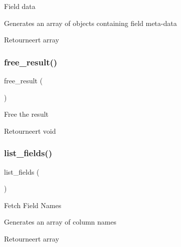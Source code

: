 Field data

Generates an array of objects containing field meta-\/data

\begin{DoxyReturn}{Retourneert}
array 
\end{DoxyReturn}
\mbox{\label{class_c_i___d_b__sqlite3__result_aad2d98d6beb3d6095405356c6107b473}} 
\subsubsection{\texorpdfstring{free\_result()}{free\_result()}}
{\footnotesize\ttfamily free\+\_\+result (\begin{DoxyParamCaption}{ }\end{DoxyParamCaption})}

Free the result

\begin{DoxyReturn}{Retourneert}
void 
\end{DoxyReturn}
\mbox{\label{class_c_i___d_b__sqlite3__result_a50b54eb4ea7cfd039740f532988ea776}} 
\subsubsection{\texorpdfstring{list\_fields()}{list\_fields()}}
{\footnotesize\ttfamily list\+\_\+fields (\begin{DoxyParamCaption}{ }\end{DoxyParamCaption})}

Fetch Field Names

Generates an array of column names

\begin{DoxyReturn}{Retourneert}
array 
\end{DoxyReturn}
\mbox{\label{class_c_i___d_b__sqlite3__result_af831bf363e4d7d661a717a4932af449d}} 
